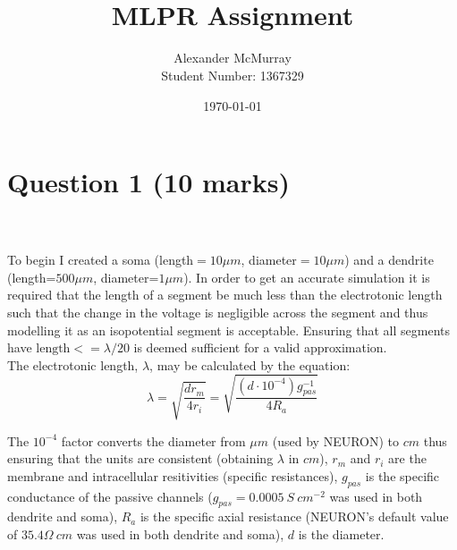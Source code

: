 \documentclass[paper=a4, fontsize=11pt]{scrartcl} %
\title{	
\normalfont \normalsize 
\horrule{0.5pt} \\[0.4cm] %
\huge MLPR Assignment} \\ %
\author{Alexander McMurray\\
Student Number: 1367329} %
\date{\normalsize\today} %
\numberwithin{equation}{section} %
\numberwithin{figure}{section} %
\numberwithin{table}{section} %
\begin{document}
\maketitle %


\section{\textbf{Question 1 (10 marks)}}

\\
\\

To begin I created a soma (length$=10\mu m$, diameter$=10\mu m$) and a dendrite (length=$500\mu m$, diameter=$1\mu m$). In order to get an accurate simulation it is required that the length of a segment be much less than the electrotonic length such that the change in the voltage is negligible across the segment and thus modelling it as an isopotential segment is acceptable. Ensuring that all segments have $\textrm{length}<= \lambda / 20$ is deemed sufficient for a valid approximation.\\

The electrotonic length, $\lambda$, may be calculated by the equation:
\begin{equation}
\lambda = \sqrt{\frac{d r_m}{4 r_i}}=\sqrt{\frac{(d \cdot 10^{-4}) g_{pas}^{-1}}{4 R_a}}
\label{eq:lambda}
\end{equation}

The $10^{-4}$ factor converts the diameter from $\mu m$ (used by NEURON) to $cm$ thus ensuring that the units are consistent (obtaining $\lambda$ in $cm$), $r_m$ and $r_i$ are the membrane and intracellular resitivities (specific resistances), $g_{pas}$ is the specific conductance of the passive channels ($g_{pas}=0.0005 ~S~cm^{-2}$ was used in both dendrite and soma), $R_a$ is the specific axial resistance (NEURON's default value of $35.4 \Omega~cm$ was used in both dendrite and soma), $d$ is the diameter.\\
\end{document}
